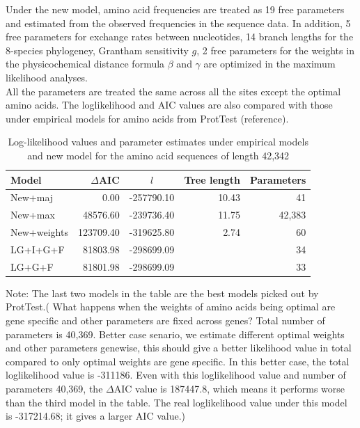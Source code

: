 \documentclass[13pt]{article}
\begin{document}
Under the new model, amino acid frequencies are treated as 19 free parameters and estimated from the observed frequencies in the sequence data. In addition, 5 free parameters for exchange rates between nucleotides, 14 branch lengths for the 8-species phylogeney, Grantham sensitivity $g$, 2 free parameters for the weights in the physicochemical distance formula $\beta$ and $\gamma$ are optimized in the maximum likelihood analyses.\\


All the parameters are treated the same across all the sites except the optimal amino acids. The loglikelihood and AIC values are also compared with those under empirical models for amino acids from ProtTest (reference). \\

\begin{table}[h]
\begin{center}
\caption{Log-likelihood values and parameter estimates under empirical models and new model for the amino acid sequences of length 42,342}
\begin{tabular}{l r c r r}
\hline
Model & $\Delta$AIC & $l$ & Tree length & Parameters \\
\hline
New+maj & 0.00 & -257790.10 &  10.43 & 41 \\
New+max & 48576.60 & -239736.40 & 11.75 & 42,383 \\
New+weights & 123709.40 & -319625.80 & 2.74 & 60 \\
LG+I+G+F & 81803.98 & -298699.09 &  & 34\\
LG+G+F & 81801.98 & -298699.09 & & 33 \\
\hline
\end{tabular}
\end{center}

Note: The last two models in the table are the best models picked out by ProtTest.({\color{blue} What happens when the weights of amino acids being optimal are gene specific and other parameters are fixed across genes? Total number of parameters is 40,369. Better case senario, we estimate different optimal weights and other parameters genewise, this should give a better likelihood value in total compared to only optimal weights are gene specific. In this better case, the total loglikelihood value is -311186. Even with this loglikelihood value and number of parameters 40,369, the $\Delta$AIC value is 187447.8, which means it performs worse than the third model in the table.} The real loglikelihood value under this model is -317214.68; it gives a larger AIC value.)
\label{table:mle}
\end{table}
\end{document}
